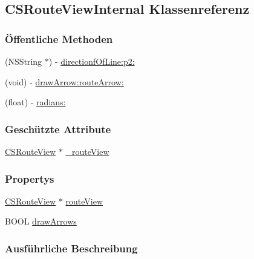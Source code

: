 \hypertarget{interface_c_s_route_view_internal}{
\subsection{CSRouteViewInternal Klassenreferenz}
\label{interface_c_s_route_view_internal}
}
\subsubsection*{Öffentliche Methoden}
\begin{DoxyCompactItemize}
\item 
(NSString $\ast$) -\/ \hyperlink{interface_c_s_route_view_internal_a6d37fc46f0fee013405917fd7e74d455}{directionfOfLine:p2:}
\item 
(void) -\/ \hyperlink{interface_c_s_route_view_internal_a0dfb98537646ea91c04f9b0f34234896}{drawArrow:routeArrow:}
\item 
(float) -\/ \hyperlink{interface_c_s_route_view_internal_afdb41f6a8d65f8a382d14c4c860e2e24}{radians:}
\end{DoxyCompactItemize}
\subsubsection*{Geschützte Attribute}
\begin{DoxyCompactItemize}
\item 
\hyperlink{interface_c_s_route_view}{CSRouteView} $\ast$ \hyperlink{interface_c_s_route_view_internal_a12be00963b31debb7c845f9197549adc}{\_\-routeView}
\end{DoxyCompactItemize}
\subsubsection*{Propertys}
\begin{DoxyCompactItemize}
\item 
\hyperlink{interface_c_s_route_view}{CSRouteView} $\ast$ \hyperlink{interface_c_s_route_view_internal_afdd115549c3d417e7fa33e60c7f14132}{routeView}
\item 
BOOL \hyperlink{interface_c_s_route_view_internal_af74604d36a54617c902613161e126e0c}{drawArrows}
\end{DoxyCompactItemize}


\subsubsection{Ausführliche Beschreibung}


